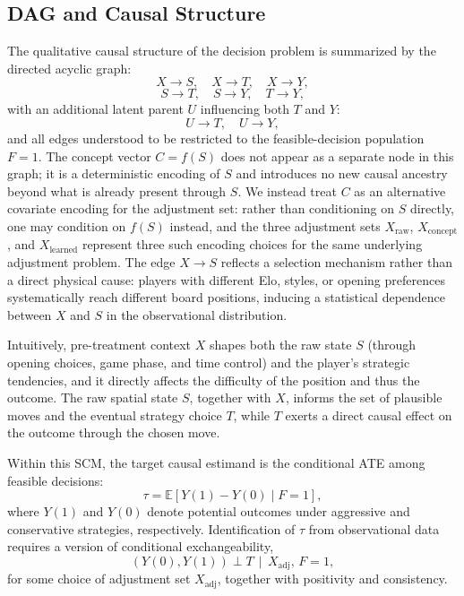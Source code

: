 \documentclass[11pt]{article}
\begin{document}
\subsection*{DAG and Causal Structure}

The qualitative causal structure of the decision problem is summarized by the directed acyclic graph:
\[
X \rightarrow S, \quad X \rightarrow T, \quad X \rightarrow Y,
\]
\[
S \rightarrow T, \quad S \rightarrow Y, \quad T \rightarrow Y,
\]
with an additional latent parent \(U\) influencing both \(T\) and \(Y\):
\[
U \rightarrow T, \quad U \rightarrow Y,
\]
and all edges understood to be restricted to the feasible-decision population \(F=1\).
The concept vector \(C = f(S)\) does not appear as a separate node in this graph;
it is a deterministic encoding of \(S\) and introduces no new causal ancestry beyond
what is already present through \(S\). We instead treat \(C\) as an alternative
covariate encoding for the adjustment set: rather than conditioning on \(S\) directly,
one may condition on \(f(S)\) instead, and the three adjustment sets
\(X_{\text{raw}}\), \(X_{\text{concept}}\), and \(X_{\text{learned}}\) represent
three such encoding choices for the same underlying adjustment problem.
The edge \(X \rightarrow S\) reflects a selection mechanism rather than a direct
physical cause: players with different Elo, styles, or opening preferences
systematically reach different board positions, inducing a statistical dependence
between \(X\) and \(S\) in the observational distribution.

Intuitively, pre-treatment context \(X\) shapes both the raw state \(S\) (through opening choices, game phase, and time control) and the player's strategic tendencies, and it directly affects the difficulty of the position and thus the outcome. The raw spatial state \(S\), together with \(X\), informs the set of plausible moves and the eventual strategy choice \(T\), while \(T\) exerts a direct causal effect on the outcome through the chosen move.

Within this SCM, the target causal estimand is the conditional ATE among feasible decisions:
\[
\tau = \mathbb{E}[Y(1) - Y(0) \mid F = 1],
\]
where \(Y(1)\) and \(Y(0)\) denote potential outcomes under aggressive and conservative strategies, respectively. Identification of \(\tau\) from observational data requires a version of conditional exchangeability,
\[
(Y(0), Y(1)) \perp T \,\mid\, X_{\text{adj}},\, F=1,
\]
for some choice of adjustment set \(X_{\text{adj}}\), together with positivity and consistency.\cite{pearl2009causality,hill2011bayesian}
\end{document}
